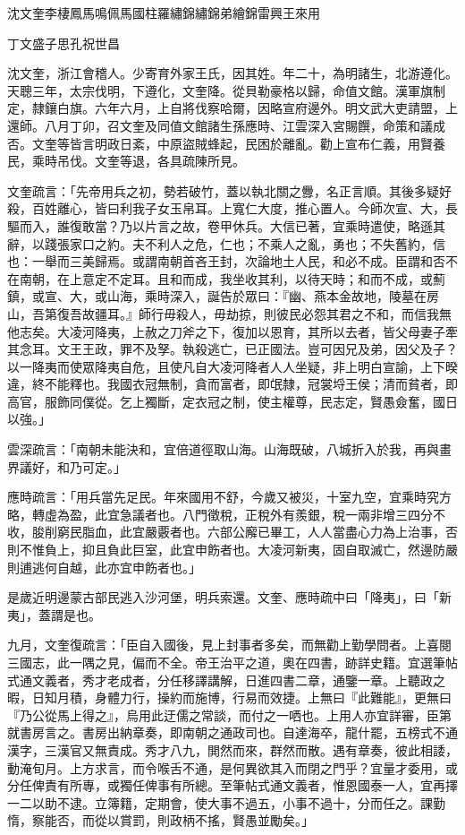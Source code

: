 
\begin{pinyinscope}
沈文奎李棲鳳馬鳴佩馬國柱羅繡錦繡錦弟繪錦雷興王來用

丁文盛子思孔祝世昌

沈文奎，浙江會稽人。少寄育外家王氏，因其姓。年二十，為明諸生，北游遵化。天聰三年，太宗伐明，下遵化，文奎降。從貝勒豪格以歸，命值文館。漢軍旗制定，隸鑲白旗。六年六月，上自將伐察哈爾，因略宣府邊外。明文武大吏請盟，上還師。八月丁卯，召文奎及同值文館諸生孫應時、江雲深入宮賜饌，命策和議成否。文奎等皆言明政日紊，中原盜賊蜂起，民困於離亂。勸上宣布仁義，用賢養民，乘時吊伐。文奎等退，各具疏陳所見。

文奎疏言：「先帝用兵之初，勢若破竹，蓋以執北關之釁，名正言順。其後多疑好殺，百姓離心，皆曰利我子女玉帛耳。上寬仁大度，推心置人。今師次宣、大，長驅而入，誰復敢當？乃以片言之故，卷甲休兵。大信已著，宜乘時遣使，略遜其辭，以踐張家口之約。夫不利人之危，仁也；不乘人之亂，勇也；不失舊約，信也：一舉而三美歸焉。或謂南朝首吝王封，次論地土人民，和必不成。臣謂和否不在南朝，在上意定不定耳。且和而成，我坐收其利，以待天時；和而不成，或薊鎮，或宣、大，或山海，乘時深入，誕告於眾曰：『幽、燕本金故地，陵墓在房山，吾第復吾故疆耳。』師行毋殺人，毋劫掠，則彼民必怨其君之不和，而信我無他志矣。大凌河降夷，上赦之刀斧之下，復加以恩育，其所以去者，皆父母妻子牽其念耳。文王王政，罪不及孥。執殺逃亡，已正國法。豈可因兄及弟，因父及子？以一降夷而使眾降夷自危，且使凡自大凌河降者人人坐疑，非上明白宣諭，上下暌違，終不能釋也。我國衣冠無制，貪而富者，即氓隸，冠裳埒王侯；清而貧者，即高官，服飾同僕從。乞上獨斷，定衣冠之制，使主權尊，民志定，賢愚僉奮，國日以強。」

雲深疏言：「南朝未能決和，宜倍道徑取山海。山海既破，八城折入於我，再與畫界議好，和乃可定。」

應時疏言：「用兵當先足民。年來國用不舒，今歲又被災，十室九空，宜乘時究方略，轉虛為盈，此宜急議者也。八門徵稅，正稅外有羨銀，稅一兩非增三四分不收，朘削窮民脂血，此宜嚴覈者也。六部公廨已畢工，人人當盡心力為上治事，否則不惟負上，抑且負此巨室，此宜申飭者也。大凌河新夷，固自取滅亡，然邊防嚴則逋逃何自越，此亦宜申飭者也。」

是歲近明邊蒙古部民逃入沙河堡，明兵索還。文奎、應時疏中曰「降夷」，曰「新夷」，蓋謂是也。

九月，文奎復疏言：「臣自入國後，見上封事者多矣，而無勸上勤學問者。上喜閱三國志，此一隅之見，偏而不全。帝王治平之道，奧在四書，跡詳史籍。宜選筆帖式通文義者，秀才老成者，分任移譯講解，日進四書二章，通鑒一章。上聽政之暇，日知月積，身體力行，操約而施博，行易而效捷。上無曰『此難能』，更無曰『乃公從馬上得之』，烏用此迂儒之常談，而付之一哂也。上用人亦宜詳審，臣第就書房言之。書房出納章奏，即南朝之通政司也。自達海卒，龍什罷，五榜式不通漢字，三漢官又無責成。秀才八九，閧然而來，群然而散。遇有章奏，彼此相諉，動淹旬月。上方求言，而令喉舌不通，是何異欲其入而閉之門乎？宜量才委用，或分任俾責有所專，或獨任俾事有所總。至筆帖式通文義者，惟恩國泰一人，宜再擇一二以助不逮。立簿籍，定期會，使大事不過五，小事不過十，分而任之。課勤惰，察能否，而從以賞罰，則政柄不搖，賢愚並勵矣。」


\end{pinyinscope}
